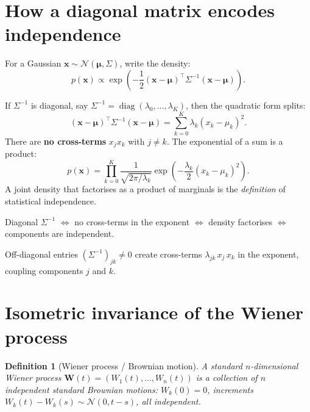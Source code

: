 \documentclass[11pt,a4paper]{article}
\newtheorem{definition}[theorem]{Definition}
\newcommand{\diag}{\operatorname{diag}}
\begin{document}
\section{How a diagonal matrix encodes independence}
\label{sec:q24}

For a Gaussian $\mathbf{x} \sim \mathcal{N}(\bm{\mu}, \Sigma)$, write the density:
\begin{equation}
  p(\mathbf{x}) \propto \exp\!\left(-\frac{1}{2}(\mathbf{x}-\bm{\mu})^\top\Sigma^{-1}(\mathbf{x}-\bm{\mu})\right).
\end{equation}

If $\Sigma^{-1}$ is diagonal, say $\Sigma^{-1} = \diag(\lambda_0, \dots, \lambda_K)$, then the quadratic form splits:
\begin{equation}
  (\mathbf{x}-\bm{\mu})^\top\Sigma^{-1}(\mathbf{x}-\bm{\mu}) = \sum_{k=0}^{K}\lambda_k(x_k - \mu_k)^2.
\end{equation}
There are \textbf{no cross-terms} $x_j x_k$ with $j \neq k$.  The exponential of a sum is a product:
\begin{equation}
  p(\mathbf{x}) = \prod_{k=0}^{K}\frac{1}{\sqrt{2\pi/\lambda_k}}\exp\!\left(-\frac{\lambda_k}{2}(x_k - \mu_k)^2\right).
\end{equation}
A joint density that factorises as a product of marginals is the \emph{definition} of statistical independence.

\begin{keybox}[Summary]
Diagonal $\Sigma^{-1}$ $\iff$ no cross-terms in the exponent $\iff$ density factorises $\iff$ components are independent.

Off-diagonal entries $(\Sigma^{-1})_{jk} \neq 0$ create cross-terms $\lambda_{jk}\,x_j\,x_k$ in the exponent, coupling components $j$ and $k$.
\end{keybox}


\section{Isometric invariance of the Wiener process}
\label{sec:q25}

\begin{definition}[Wiener process / Brownian motion]
A standard $n$-dimensional Wiener process $\mathbf{W}(t) = (W_1(t), \dots, W_n(t))$ is a collection of $n$ independent standard Brownian motions: $W_k(0) = 0$, increments $W_k(t) - W_k(s) \sim \mathcal{N}(0, t - s)$, all independent.
\end{definition}
\end{document}
